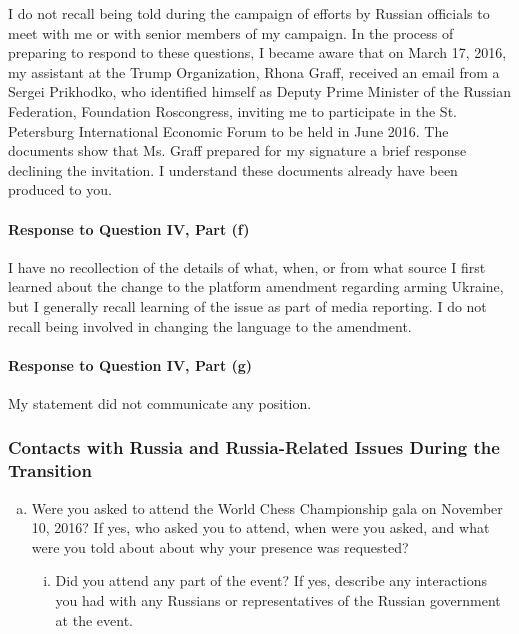 I do not recall being told during the campaign of efforts by Russian officials to meet with me or with senior members of my campaign.
In the process of preparing to respond to these questions, I became aware that on March 17, 2016, my assistant at the Trump Organization, Rhona Graff, received an email from a Sergei Prikhodko, who identified himself as Deputy Prime Minister of the Russian Federation, Foundation Roscongress, inviting me to participate in the St. Petersburg International Economic Forum to be held in June 2016.
The documents show that Ms. Graff prepared for my signature a brief response declining the invitation.
I understand these documents already have been produced to you.

\paragraph*{Response to Question IV, Part (f)}

I have no recollection of the details of what, when, or from what source I first learned about the change to the platform amendment regarding arming Ukraine, but I generally recall learning of the issue as part of media reporting.
I do not recall being involved in changing the language to the amendment.

\paragraph*{Response to Question IV, Part (g)}

My statement did not communicate any position.

\subsubsection{Contacts with Russia and Russia-Related Issues During the Transition}

\begin{enumerate}[a.]

\item Were you asked to attend the World Chess Championship gala on November 10, 2016?
If yes, who asked you to attend, when were you asked, and what were you told about about why your presence was requested?

\begin{enumerate}[i.]

\item Did you attend any part of the event?
If yes, describe any interactions you had with any Russians or representatives of the Russian government at the event.

\end{enumerate}

\end{enumerate}

